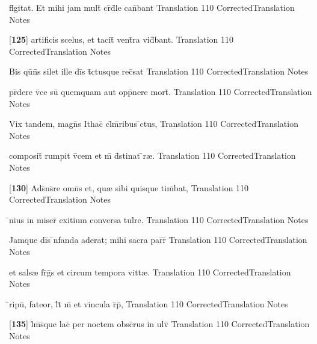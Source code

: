 \latline
  {fl\={}gitat.  Et mihi jam mult\={\macron {\i}} cr\={}d\={}le can\={}bant}
  { Translation }
  {110}
  { CorrectedTranslation }
  { Notes }


\latline
  {[\textbf{125}] artificis scelus, et tacit\={\macron {\i}} vent\={}ra vid\={}bant.}
  { Translation }
  {110}
  { CorrectedTranslation }
  { Notes }


\latline
  {Bis qu\={\macron {\i}}n\={}s silet ille di\={}s t\={}ctusque rec\={}sat}
  { Translation }
  {110}
  { CorrectedTranslation }
  { Notes }


\latline
  {pr\={}dere v\={}ce su\={} quemquam aut opp\={}nere mort\={\macron {\i}}.}
  { Translation }
  {110}
  { CorrectedTranslation }
  { Notes }


\latline
  {Vix tandem, magn\={\macron {\i}}s Ithac\={\macron {\i}} cl\={}m\={}ribus \={}ctus,}
  { Translation }
  {110}
  { CorrectedTranslation }
  { Notes }


\latline
  {composit\={} rumpit v\={}cem et m\={} d\={}stinat \={}r{\ae}.}
  { Translation }
  {110}
  { CorrectedTranslation }
  { Notes }


\latline
  {[\textbf{130}] Ads\={}ns\={}re omn\={}s et, qu{\ae} sibi quisque tim\={}bat,}
  { Translation }
  {110}
  { CorrectedTranslation }
  { Notes }


\latline
  {\={}nius in miser\={\macron {\i}} exitium conversa tul\={}re.}
  { Translation }
  {110}
  { CorrectedTranslation }
  { Notes }


\latline
  {Jamque di\={}s \={\macron {\i}}nfanda aderat; mihi sacra par\={}r\={\macron {\i}} }
  { Translation }
  {110}
  { CorrectedTranslation }
  { Notes }


\latline
  {et sals{\ae} fr\={}g\={}s et circum tempora vitt{\ae}.}
  { Translation }
  {110}
  { CorrectedTranslation }
  { Notes }


\latline
  {\={}ripu\={\macron {\i}}, fateor, l\={}t\={} m\={} et vincula r\={}p\={\macron {\i}},}
  { Translation }
  {110}
  { CorrectedTranslation }
  { Notes }


\latline
  {[\textbf{135}] l\={\macron {\i}}m\={}s\={}que lac\={} per noctem obsc\={}rus in ulv\={}}
  { Translation }
  {110}
  { CorrectedTranslation }
  { Notes }


